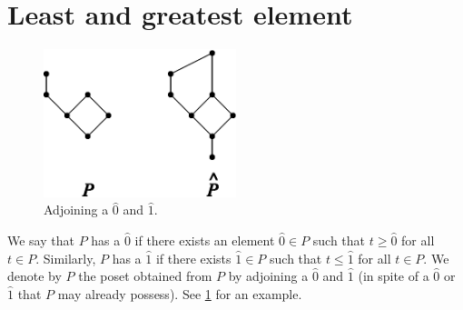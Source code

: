 \section{Least and greatest element}


\begin{figure}
	\centering
	\includegraphics[width=0.5\textwidth]{fig/stanley/3-3}
	\caption{\label{fig:stanley:3-3} Adjoining a $\hat{0}$ and $\hat{1}$. \cite{Stanley:2011:ECV:2124415}}
\end{figure}


We say that $P$ has a $\hat{0}$ if there exists an element $\hat{0} \in P$ such that $t \geq \hat{0}$ for all $t \in P$. Similarly, $P$ has a $\hat{1}$ if there exists $\hat{1} \in P$ such that $t \leq \hat{1}$ for all $t \in P$. We denote by $P$ the poset obtained from $P$ by adjoining a $\hat{0}$ and $\hat{1}$ (in spite of a $\hat{0}$ or $\hat{1}$ that $P$ may already possess). See \ref{fig:stanley:3-3} for an example. \cite{Stanley:2011:ECV:2124415}



